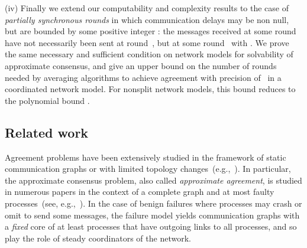 \documentclass[a4paper]{article}
\theoremstyle{newthm}
\begin{document}
(iv) Finally we extend our computability and complexity results to the case of {\em partially synchronous rounds}
	in which communication delays may be non null, but are bounded by some positive
	integer : the messages  received at some round~  have not necessarily been sent at round~,
	but  at some round~ with .
We prove  the same necessary and sufficient condition on network models  for 
	solvability of approximate consensus, and  give an  
	upper bound on the number of rounds needed by averaging algorithms to achieve agreement with precision of~ 
	in a coordinated network model.
For nonsplit network models, this bound reduces to the polynomial bound .
	
	
\subsection{Related work}

Agreement problems have been extensively studied in the framework of static
	communication graphs or with limited topology 
	changes~(e.g.,~\cite{Lyn96,AW05, PBE07,Vai14}).
In particular, the approximate consensus problem, also called {\em approximate
	agreement}, is studied in numerous papers in the context of a complete 
	graph and at most  faulty processes~(see, e.g.,~\cite{DLPSW86, Fek90,ALS94}).
In the case of benign failures where processes may crash or  omit to send some messages,
	the failure model yields communication graphs with a {\em fixed} core of at least  processes
	that have outgoing links to all processes, and so play the role of
	steady coordinators of  the network.
\end{document}

